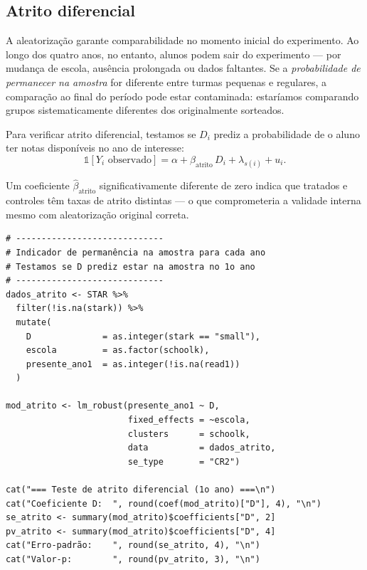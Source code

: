 \subsection*{Atrito diferencial}

A aleatorização garante comparabilidade no momento inicial do experimento. Ao longo dos quatro anos, no entanto, alunos podem sair do experimento --- por mudança de escola, ausência prolongada ou dados faltantes. Se a \textit{probabilidade de permanecer na amostra} for diferente entre turmas pequenas e regulares, a comparação ao final do período pode estar contaminada: estaríamos comparando grupos sistematicamente diferentes dos originalmente sorteados.

Para verificar atrito diferencial, testamos se $D_i$ prediz a probabilidade de o aluno ter notas disponíveis no ano de interesse:
\begin{equation}
  \mathds{1}[Y_i \text{ observado}] = \alpha + \beta_{\text{atrito}}\, D_i + \lambda_{s(i)} + u_i.
  \label{eq:atrito}
\end{equation}

Um coeficiente $\hat{\beta}_{\text{atrito}}$ significativamente diferente de zero indica que tratados e controles têm taxas de atrito distintas --- o que comprometeria a validade interna mesmo com aleatorização original correta.

\begin{lstlisting}[style=Rstyle, caption={Verificação de atrito diferencial}]
# -----------------------------
# Indicador de permanência na amostra para cada ano
# Testamos se D prediz estar na amostra no 1o ano
# -----------------------------
dados_atrito <- STAR %>%
  filter(!is.na(stark)) %>%
  mutate(
    D              = as.integer(stark == "small"),
    escola         = as.factor(schoolk),
    presente_ano1  = as.integer(!is.na(read1))
  )

mod_atrito <- lm_robust(presente_ano1 ~ D,
                        fixed_effects = ~escola,
                        clusters      = schoolk,
                        data          = dados_atrito,
                        se_type       = "CR2")

cat("=== Teste de atrito diferencial (1o ano) ===\n")
cat("Coeficiente D:  ", round(coef(mod_atrito)["D"], 4), "\n")
se_atrito <- summary(mod_atrito)$coefficients["D", 2]
pv_atrito <- summary(mod_atrito)$coefficients["D", 4]
cat("Erro-padrão:    ", round(se_atrito, 4), "\n")
cat("Valor-p:        ", round(pv_atrito, 3), "\n")
\end{lstlisting}

